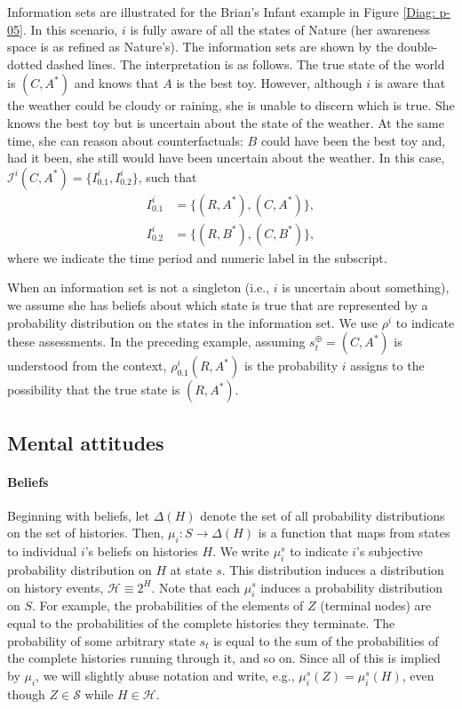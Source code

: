 \documentclass[
11pt,
titlepage,
reqno,
]{article}%
\theoremstyle{definition}
\begin{document}
	Information sets are illustrated for the Brian's Infant example in Figure \ref{Diag: p-05}. 
	In this scenario, $i$ is fully aware of all the states of Nature (her awareness space is as refined as Nature's). The information sets are shown by the double-dotted dashed lines. 
	The interpretation is as follows. 
	The true state of the world is $(C,A^\ast)$ and knows that $A$ is the best toy. 
	However, although $i$ is aware that the weather could be cloudy or raining, she is unable to discern which is true. 
	She knows the best toy but is uncertain about the state of the weather. 
	At the same time, she can reason about counterfactuals: $B$ could have been the best toy and, had it been, she still would have been uncertain about the weather. 
	In this case, $\mathcal{I}^i(C,A^\ast)=\{I^i_{0.1},I^i_{0.2}\}$, such that
	\begin{align*}
		I^i_{0.1}&=\{(R,A^\ast),(C,A^\ast)\},\\
		I^i_{0.2}&=\{(R,B^\ast),(C,B^\ast)\},
	\end{align*}
	where we indicate  the time period and numeric label in the subscript.
	
	When an information set is not a singleton (i.e., $i$ is uncertain about something), we assume she has beliefs about which state is true that are represented by a probability distribution on the states in the information set. 
	We use $\rho^i$ to indicate these assessments. 
	In the preceding example, assuming $s^\oplus_t=(C,A^\ast)$ is understood from the context, $\rho^i_{0.1}(R,A^\ast)$ is the probability $i$ assigns to the possibility that the true state is $(R,A^\ast)$.
\subsection{Mental attitudes\label{sec:attitudes}}

\paragraph{Beliefs \label{para: beliefs}}
	Beginning with beliefs, let $\Delta(H)$ denote the set of all probability distributions on the set of histories. 
	Then,  $\mu_i:S\rightarrow \Delta(H)$ is a function that maps from states to individual $i$'s beliefs on histories $H$. 
	We write  $\mu_i^s$ to indicate $i$'s subjective probability distribution on $H$ at state $s$.
	This distribution induces a distribution on history events, $\mathcal{H}\equiv 2^H$. 
	Note that each $\mu_i^s$ induces a probability distribution on $S$.
	For example, the probabilities of the elements of $Z$ (terminal nodes) are equal to the probabilities of the complete histories they terminate. 
	The probability of some arbitrary state $s_t$ is equal to the sum of the probabilities of the complete histories running through it, and so on.
	Since all of this is implied by $\mu_i$, we will slightly abuse notation and write, e.g.,  $\mu_i^s(Z)=\mu_i^s(H)$, even though $Z\in \mathcal{S}$ while $H\in \mathcal{H}$.
	
\end{document}
